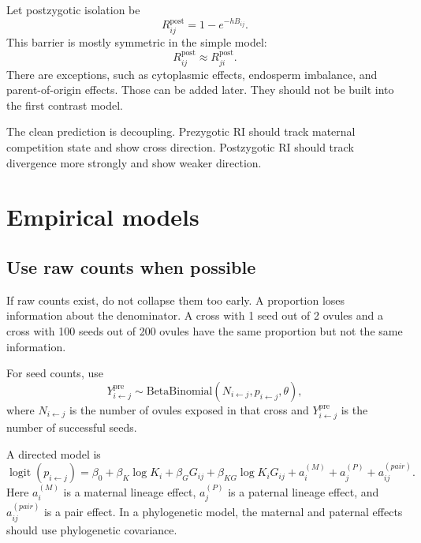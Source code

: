 \documentclass[12pt]{article}
\newcommand{\Rpost}{R^{\mathrm{post}}}
\newcommand{\logit}{\operatorname{logit}}
\begin{document}
Let postzygotic isolation be
\begin{equation}
\Rpost_{ij}=1-e^{-hB_{ij}}.
\label{eq:Rpost}
\end{equation}
This barrier is mostly symmetric in the simple model:
\begin{equation}
\Rpost_{ij}\approx \Rpost_{ji}.
\end{equation}
There are exceptions, such as cytoplasmic effects, endosperm imbalance, and parent-of-origin effects. Those can be added later. They should not be built into the first contrast model.

\begin{conclusionbox}
The clean prediction is decoupling. Prezygotic RI should track maternal competition state and show cross direction. Postzygotic RI should track divergence more strongly and show weaker direction.
\end{conclusionbox}

\section{Empirical models}

\subsection{Use raw counts when possible}

If raw counts exist, do not collapse them too early. A proportion loses information about the denominator. A cross with 1 seed out of 2 ovules and a cross with 100 seeds out of 200 ovules have the same proportion but not the same information.

For seed counts, use
\begin{equation}
Y^{\mathrm{pre}}_{i\leftarrow j}\sim
\mathrm{BetaBinomial}\left(N_{i\leftarrow j},p_{i\leftarrow j},\theta\right),
\label{eq:betabinom}
\end{equation}
where $N_{i\leftarrow j}$ is the number of ovules exposed in that cross and $Y^{\mathrm{pre}}_{i\leftarrow j}$ is the number of successful seeds.

A directed model is
\begin{equation}
\logit(p_{i\leftarrow j})=
\beta_0+\beta_K\log K_i+\beta_GG_{ij}
+\beta_{KG}\log K_iG_{ij}
+a_i^{(M)}+a_j^{(P)}+a_{ij}^{(pair)}.
\label{eq:directModel}
\end{equation}
Here $a_i^{(M)}$ is a maternal lineage effect, $a_j^{(P)}$ is a paternal lineage effect, and $a_{ij}^{(pair)}$ is a pair effect. In a phylogenetic model, the maternal and paternal effects should use phylogenetic covariance.
\end{document}
